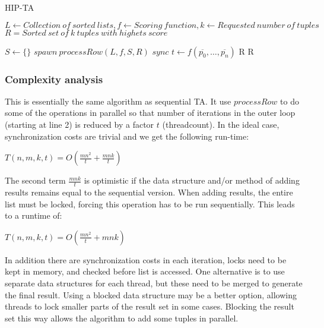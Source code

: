 \begin{algorithm}[H]
	\caption{HIP-TA}
	\label{alg:ta-parallel-basic}
	\begin{algorithmic}[1]
		\REQUIRE $
			L \leftarrow Collection\ of\ sorted\ lists,
			f \leftarrow Scoring\ function,
			k \leftarrow Requested\ number\ of\ tuples$
		\ENSURE $R = Sorted\ set\ of\ k\ tuples\ with\ highets\ score$

		\STATE $S \leftarrow \{\}$
				\STATE $spawn\ processRow(L, f, S, R)$
			\ENDFOR
			\STATE $sync$
			\STATE $t \leftarrow f(\overline{p_0}, \ldots, \overline{p_n})$
				\RETURN R
			\ENDIF
		\ENDWHILE
		\RETURN R
	\end{algorithmic}
\end{algorithm}

\subsubsection{Complexity analysis}

This is essentially the same algorithm as sequential TA. It use $processRow$
to do some of the operations in parallel so that number of iterations
in the outer loop (starting at line 2) is reduced by a factor $t$
(threadcount). In the ideal case, synchronization costs are trivial
and we get the following run-time:

$T(n,m,k,t) = O(\frac{mn^2}{t} + \frac{mnk}{t})$

The second term $\frac{mnk}{t}$ is optimistic if the data structure
and/or method of adding results remains equal to the sequential
version. When adding results, the entire list must be locked, forcing
this operation has to be run sequentially. This leads to a runtime of:

$T(n,m,k,t) = O(\frac{mn^2}{t} + mnk)$

In addition there are synchronization costs in each iteration, locks
need to be kept in memory, and checked before list is accessed. One
alternative is to use separate data structures for each thread, but
these need to be merged to generate the final result. Using a blocked
data structure may be a better option, allowing threads to lock
smaller parts of the result set in some cases. Blocking the result set
this way allows the algorithm to add some tuples in parallel.

